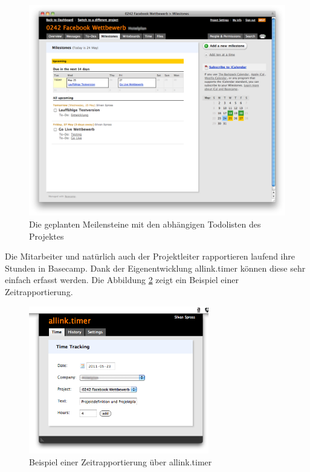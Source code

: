 \begin{figure}[htbp]
\begin{center}
\includegraphics[width=1.0\textwidth,angle=0]{./bilder/proof_of_concept/meilensteine_poc.png}
\caption[Die geplanten Meilensteine mit den abhängigen Todolisten des Projektes]{Die 
    geplanten Meilensteine mit den abhängigen Todolisten des Projektes\footnotemark}
\label{pic:meilensteine_poc}
\end{center}
\end{figure}

Die Mitarbeiter und natürlich auch der Projektleiter rapportieren laufend
ihre Stunden in Basecamp. Dank der Eigenentwicklung allink.timer können
diese sehr einfach erfasst werden. Die Abbildung \ref{pic:allink_timer} zeigt
ein Beispiel einer Zeitrapportierung.

\clearpage

\begin{figure}[htbp]
\begin{center}
\includegraphics[width=0.7\textwidth,angle=0]{./bilder/proof_of_concept/allink_timer.png}
\caption[Beispiel einer Zeitrapportierung über allink.timer]{Beispiel einer 
    Zeitrapportierung über allink.timer\footnotemark}
\label{pic:allink_timer}
\end{center}
\end{figure}

